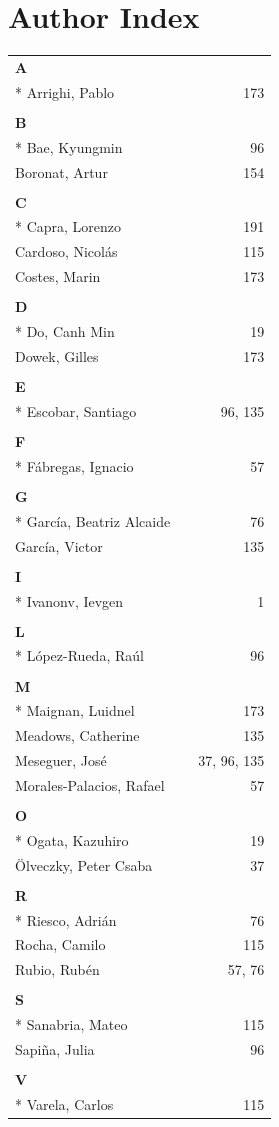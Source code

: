 \documentclass[a4paper]{llncs}
\begin{document}
\section*{Author Index}
\begin{longtable}{lp{10em}r}
\\
\textbf{A} \\*
Arrighi, Pablo & & 173
\\
\\
\textbf{B} \\*
Bae, Kyungmin & & 96
\\
Boronat, Artur & & 154 
\\
\\
\textbf{C} \\*
Capra, Lorenzo & & 191
\\
Cardoso, Nicolás & & 115 
\\
Costes, Marin & & 173
\\
\\
\textbf{D} \\*
Do, Canh Min & & 19 
\\
Dowek, Gilles & & 173
\\
\\
\textbf{E} \\*
Escobar, Santiago & & 96, 135
\\
\\
\textbf{F} \\*
Fábregas, Ignacio & & 57 
\\
\\
\textbf{G} \\*
García, Beatriz Alcaide & & 76 
\\
García, Victor & & 135
\\
\\
\textbf{I} \\*
Ivanonv, Ievgen & & 1 
\\
\\
\textbf{L} \\*
López-Rueda, Raúl & & 96 
\\
\\
\textbf{M} \\*
Maignan, Luidnel & & 173
\\
Meadows, Catherine & & 135
\\
Meseguer, Jos\'e & & 37, 96, 135
\\
Morales-Palacios, Rafael & & 57
\\
\\
\textbf{O} \\*
Ogata, Kazuhiro & & 19 
\\
Ölveczky, Peter Csaba & & 37
\\
\\
\textbf{R} \\*
Riesco, Adrián & & 76 
\\
Rocha, Camilo & & 115
\\
Rubio, Rub\'en & & 57, 76 
\\
\\
\textbf{S} \\*
Sanabria, Mateo & & 115
\\
Sapiña, Julia & & 96
\\
\\
\textbf{V} \\*
Varela, Carlos & & 115
\end{longtable}
\end{document}
